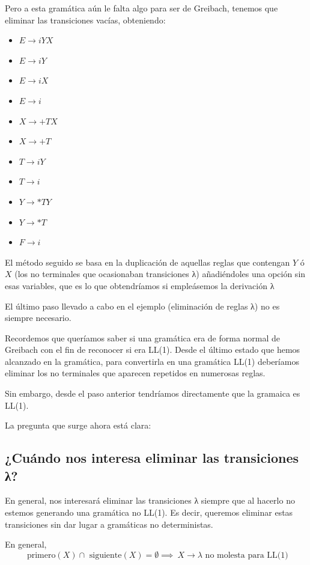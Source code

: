 \documentclass{apuntes}
\begin{document}
\begin{example}
Pero a esta gramática aún le falta algo para ser de Greibach, tenemos que eliminar las transiciones vacías, obteniendo:
\begin{itemize}
\item $E \rightarrow iYX$
\item $E \rightarrow iY$
\item $E \rightarrow iX$
\item $E \rightarrow i$
\item $X \rightarrow +TX$
\item $X \rightarrow +T$
\item $T \rightarrow iY$
\item $T \rightarrow i$
\item $Y \rightarrow *TY$
\item $Y \rightarrow *T$
\item $F \rightarrow i$
\end{itemize}
El método seguido se basa en la duplicación de aquellas reglas que contengan $Y$ ó $X$ (los no terminales que ocasionaban transiciones λ) añadiéndoles una opción sin esas variables, que es lo que obtendríamos si empleásemos la derivación λ
\end{example}

El último paso llevado a cabo en el ejemplo (eliminación de reglas λ) no es siempre necesario.

Recordemos que queríamos saber si una gramática era de forma normal de Greibach con el fin de reconocer si era LL(1). Desde el último estado que hemos alcanzado en la gramática, para convertirla en una gramática LL(1) deberíamos eliminar los no terminales que aparecen repetidos en numerosas reglas.

Sin embargo, desde el paso anterior tendríamos directamente que la gramaica es LL(1).

La pregunta que surge ahora está clara:

\subsection{¿Cuándo nos interesa eliminar las transiciones λ?}
En general, nos interesará eliminar las transiciones λ siempre que al hacerlo no estemos generando una gramática no LL(1). Es decir, queremos eliminar estas transiciones sin dar lugar a gramáticas no deterministas.

En general,
\[\text{ primero}(X) \cap \text{ siguiente}(X) = \emptyset \implies \ X \rightarrow λ\text{ no molesta para LL(1)}\]
\end{document}
